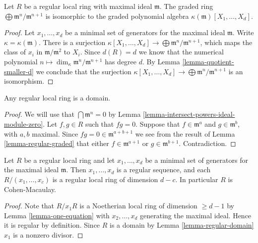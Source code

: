 \begin{lemma}
\label{lemma-regular-graded}
Let $R$ be a regular local ring with maximal ideal $\mathfrak m$.
The graded ring $\bigoplus \mathfrak m^n / \mathfrak m^{n + 1}$
is isomorphic to the graded polynomial algebra
$\kappa(\mathfrak m)[X_1, \ldots, X_d]$.
\end{lemma}

\begin{proof}
Let $x_1, \ldots, x_d$ be a minimal set of generators
for the maximal ideal $\mathfrak m$.
Write $\kappa = \kappa(\mathfrak m)$.
There is a surjection $\kappa[X_1, \ldots, X_d]
\to \bigoplus \mathfrak m^n/\mathfrak m^{n + 1}$,
which maps the class of $x_i$ in $\mathfrak m/\mathfrak m^2$
to $X_i$. Since $d(R) = d$ we know that the numerical
polynomial $n \mapsto \dim_\kappa \mathfrak m^n/\mathfrak m^{n + 1}$
has degree $d$. By Lemma \ref{lemma-quotient-smaller-d} we
conclude that the surjection $\kappa[X_1, \ldots, X_d]
\to \bigoplus \mathfrak m^n/\mathfrak m^{n + 1}$ is an isomorphism.
\end{proof}

\begin{lemma}
\label{lemma-regular-domain}
Any regular local ring is a domain.
\end{lemma}

\begin{proof}
We will use that $\bigcap \mathfrak m^n = 0$
by Lemma \ref{lemma-intersect-powers-ideal-module-zero}.
Let $f, g \in R$ such that $fg = 0$.
Suppose that $f \in \mathfrak m^a$ and
$g \in \mathfrak m^b$, with $a, b$ maximal.
Since $fg = 0 \in \mathfrak m^{a + b + 1}$
we see from the result of Lemma \ref{lemma-regular-graded}
that either $f \in \mathfrak m^{a + 1}$ or
$g \in \mathfrak m^{b + 1}$. Contradiction.
\end{proof}

\begin{lemma}
\label{lemma-regular-ring-CM}
Let $R$ be a regular local ring and let
$x_1, \ldots, x_d$ be a minimal set of generators
for the maximal ideal $\mathfrak m$. Then
$x_1, \ldots, x_d$ is a regular sequence, and
each $R/(x_1, \ldots, x_c)$ is a regular local ring
of dimension $d - c$. In particular $R$ is Cohen-Macaulay.
\end{lemma}

\begin{proof}
Note that $R/x_1R$ is a Noetherian local ring of dimension $\geq d - 1$
by Lemma \ref{lemma-one-equation} with $x_2, \ldots, x_d$
generating the maximal ideal. Hence it is regular by definition.
Since $R$ is a domain by Lemma \ref{lemma-regular-domain}
$x_1$ is a nonzero divisor.
\end{proof}

